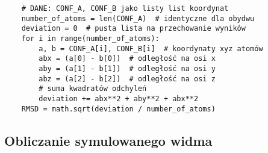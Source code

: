 \begin{listing}
  \begin{lstlisting}
    # DANE: CONF_A, CONF_B jako listy list koordynat
    number_of_atoms = len(CONF_A)  # identyczne dla obydwu
    deviation = 0  # pusta lista na przechowanie wyników
    for i in range(number_of_atoms):
        a, b = CONF_A[i], CONF_B[i]  # koordynaty xyz atomów
        abx = (a[0] - b[0])  # odległość na osi x
        aby = (a[1] - b[1])  # odległość na osi y
        abz = (a[2] - b[2])  # odległość na osi z
        # suma kwadratów odchyleń
        deviation += abx**2 + aby**2 + abx**2
    RMSD = math.sqrt(deviation / number_of_atoms)
  \end{lstlisting}
  \caption{
    Algorytm obliczania wartości \gls{rmsd} dwóch konformerów.
    Obydwie listy muszą składać się z~atomów ułożonych w~tym samym porządku.
    Zakładam, że konformer reprezentowany jest przez listę koordynat położenia każdego
      z~atomów w~trzech wymiarach, czyli \lstinline|CONF = [[x0, y0, z0], [x1, y1, z1], ...]|.
    Wyrażenie \lstinline|zmienna += wartość| oznacza dodanie danej wartości do~wartości zmiennej.
  }\label{lst:rmsd}
\end{listing}

\subsection{Obliczanie symulowanego widma}\label{implementation:spectra}
